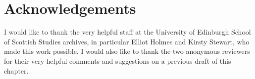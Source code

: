 \documentclass[output=paper,colorlinks,citecolor=brown]{langscibook}
\begin{document}

\section*{Acknowledgements}
I would like to thank the very helpful staff at the University of Edinburgh School of Scottish Studies archives, in particular Elliot Holmes and Kirsty Stewart, who made this work possible. I would also like to thank the two anonymous reviewers for their very helpful comments and suggestions on a previous draft of this chapter. 

\sloppy
\printbibliography[heading=subbibliography,notkeyword=this]

\end{document}

